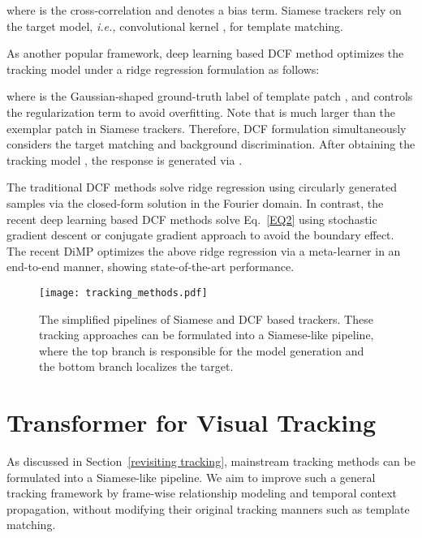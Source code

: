 \documentclass[10pt,twocolumn,letterpaper]{article}
\begin{document}
where  is the cross-correlation and  denotes a bias term.
Siamese trackers rely on the target model, \emph{i.e.,} convolutional kernel , for template matching.



As another popular framework, deep learning based DCF method optimizes the tracking model  under a ridge regression formulation \cite{CREST,ATOM,DiMP} as follows:

where  is the Gaussian-shaped ground-truth label of template patch , and  controls the regularization term to avoid overfitting.
Note that  is much larger than the exemplar patch   in Siamese trackers.
Therefore, DCF formulation simultaneously considers the target matching and background discrimination.
After obtaining the tracking model , the response is generated via .



The traditional DCF methods \cite{KCF,DSST} solve ridge regression using circularly generated samples via the closed-form solution in the Fourier domain.
In contrast, the recent deep learning based DCF methods solve Eq.~\ref{EQ2} using stochastic gradient descent \cite{CREST,DSLT} or conjugate gradient approach \cite{ATOM} to avoid the boundary effect.
The recent DiMP \cite{DiMP} optimizes the above ridge regression via a meta-learner in an end-to-end manner, showing state-of-the-art performance.



\begin{figure}
	\centering
	\texttt{[image: tracking\_methods.pdf]}
	\caption{The simplified pipelines of Siamese \cite{SiamFC} and DCF \cite{ATOM,DiMP} based trackers. These tracking approaches can be formulated into a Siamese-like pipeline, where the top branch is responsible for the model generation and the bottom branch localizes the target.}\label{fig:tracking_methods}
	\vspace{-0.08in}
\end{figure}



\section{Transformer for Visual Tracking}
As discussed in Section~\ref{revisiting tracking}, mainstream tracking methods can be formulated into a Siamese-like pipeline. 
We aim to improve such a general tracking framework by frame-wise relationship modeling and temporal context propagation, without modifying their original tracking manners such as template matching.
\end{document}
